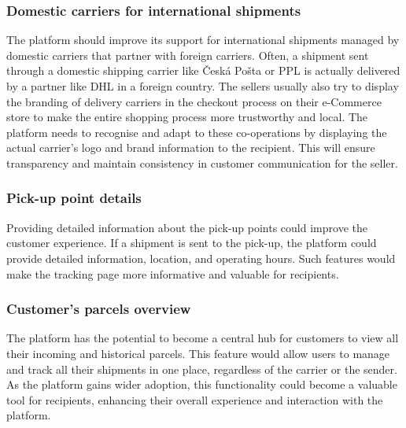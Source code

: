 \subsubsection*{Domestic carriers for international shipments}
The platform should improve its support for international shipments managed by domestic carriers that partner with foreign carriers. 
Often, a shipment sent through a domestic shipping carrier like Česká Pošta or PPL is actually delivered by a partner like DHL in a foreign country.
The sellers usually also try to display the branding of delivery carriers in the checkout process on their e-Commerce store to make the entire shopping process more trustworthy and local.
The platform needs to recognise and adapt to these co-operations by displaying the actual carrier's logo and brand information to the recipient. 
This will ensure transparency and maintain consistency in customer communication for the seller.

\subsubsection*{Pick-up point details}
Providing detailed information about the pick-up points could improve the customer experience. 
If a shipment is sent to the pick-up, the platform could provide detailed information, location, and operating hours. 
Such features would make the tracking page more informative and valuable for recipients.

\subsubsection*{Customer's parcels overview}
The platform has the potential to become a central hub for customers to view all their incoming and historical parcels.
This feature would allow users to manage and track all their shipments in one place, regardless of the carrier or the sender.
As the platform gains wider adoption, this functionality could become a valuable tool for recipients, enhancing their overall experience and interaction with the platform.

